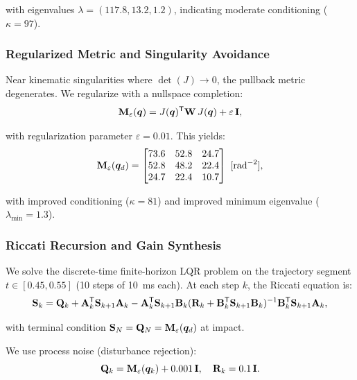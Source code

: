 with eigenvalues $\lambda = (117.8, 13.2, 1.2)$, indicating moderate conditioning
($\kappa = 97$).

\subsubsection{Regularized Metric and Singularity Avoidance}

Near kinematic singularities where $\det(J) \to 0$, the pullback metric degenerates.
We regularize with a nullspace completion:
\begin{equation}
\mathbf{M}_\varepsilon(\bm{q}) = J(\bm{q})^{\mathsf{T}}\mathbf{W}\,J(\bm{q}) + \varepsilon\,\mathbf{I},
\label{eq:ch8:regularized}
\end{equation}

with regularization parameter $\varepsilon = 0.01$. This yields:
\begin{equation}
\mathbf{M}_\varepsilon(\bm{q}_d) = \begin{bmatrix}
73.6 & 52.8 & 24.7 \\
52.8 & 48.2 & 22.4 \\
24.7 & 22.4 & 10.7
\end{bmatrix}~[\text{rad}^{-2}],
\label{eq:ch8:Meps-numeric}
\end{equation}

with improved conditioning ($\kappa = 81$) and improved minimum eigenvalue ($\lambda_{\min} = 1.3$).

\subsubsection{Riccati Recursion and Gain Synthesis}

We solve the discrete-time finite-horizon LQR problem on the trajectory segment $t \in [0.45, 0.55]$
(10 steps of 10~ms each). At each step $k$, the Riccati equation is:
\begin{equation}
\mathbf{S}_k = \mathbf{Q}_k + \mathbf{A}_k^{\mathsf{T}}\mathbf{S}_{k+1}\mathbf{A}_k
- \mathbf{A}_k^{\mathsf{T}}\mathbf{S}_{k+1}\mathbf{B}_k(\mathbf{R}_k + \mathbf{B}_k^{\mathsf{T}}\mathbf{S}_{k+1}\mathbf{B}_k)^{-1}
\mathbf{B}_k^{\mathsf{T}}\mathbf{S}_{k+1}\mathbf{A}_k,
\label{eq:ch8:riccati-discrete}
\end{equation}

with terminal condition $\mathbf{S}_{N} = \mathbf{Q}_N = \mathbf{M}_\varepsilon(\bm{q}_d)$ at impact.

We use process noise (disturbance rejection):
\begin{equation}
\mathbf{Q}_k = \mathbf{M}_\varepsilon(\bm{q}_k) + 0.001\,\mathbf{I}, \quad \mathbf{R}_k = 0.1\,\mathbf{I}.
\label{eq:ch8:QR-planar}
\end{equation}

